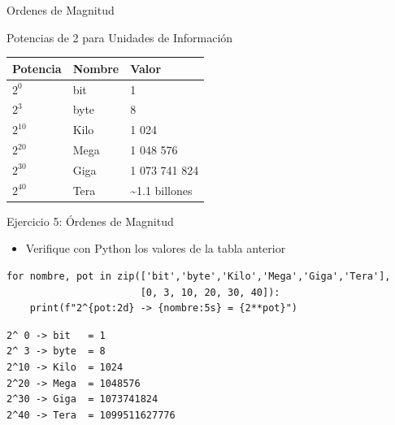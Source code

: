 \documentclass[presentation]{beamer}
\begin{document}
\begin{frame}[label={sec:orge49928f},fragile]{Ordenes de Magnitud}
 \begin{block}{Potencias de 2 para Unidades de Información}
\begin{center}
\begin{tabular}{lll}
Potencia & Nombre & Valor\\[0pt]
\hline
\(2^0\) & bit & 1\\[0pt]
\(2^3\) & byte & 8\\[0pt]
\(2^{10}\) & Kilo & 1 024\\[0pt]
\(2^{20}\) & Mega & 1 048 576\\[0pt]
\(2^{30}\) & Giga & 1 073 741 824\\[0pt]
\(2^{40}\) & Tera & \textasciitilde{}1.1 billones\\[0pt]
\end{tabular}
\end{center}
\end{block}

\begin{block}{Ejercicio 5: Órdenes de Magnitud}
\begin{itemize}
\item Verifique con Python los valores de la tabla anterior
\end{itemize}

\begin{verbatim}
for nombre, pot in zip(['bit','byte','Kilo','Mega','Giga','Tera'],
                       [0, 3, 10, 20, 30, 40]):
    print(f"2^{pot:2d} -> {nombre:5s} = {2**pot}")
\end{verbatim}

\begin{verbatim}
2^ 0 -> bit   = 1
2^ 3 -> byte  = 8
2^10 -> Kilo  = 1024
2^20 -> Mega  = 1048576
2^30 -> Giga  = 1073741824
2^40 -> Tera  = 1099511627776
\end{verbatim}
\end{block}
\end{frame}
\end{document}
